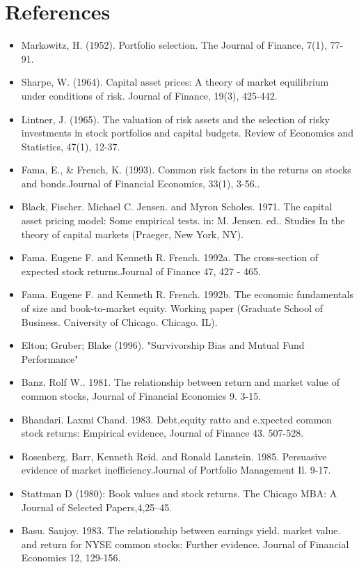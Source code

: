 \documentclass[12pt]{article}
\begin{document}
	\section{References} %
	\begin{itemize}
		\item Markowitz, H. (1952). Portfolio selection. The Journal of Finance, 7(1), 77-91.
		\item Sharpe, W. (1964). Capital asset prices: A theory of market equilibrium under conditions of risk. Journal of Finance, 19(3), 425-442.
		\item Lintner, J. (1965). The valuation of risk assets and the selection of risky investments in stock portfolios and capital budgets. Review of Economics and Statistics, 47(1), 12-37.
		\item Fama, E., \& French, K. (1993). Common risk factors in the returns on stocks and bonds.Journal of Financial Economics, 33(1), 3-56..
		\item Black, Fischer. Michael C. Jensen. and Myron Scholes. 1971. The capital asset pricing model: Some empirical tests. in: M. Jensen. ed.. Studies In the theory of capital markets (Praeger, New York, NY).
		\item Fama. Eugene F. and Kenneth R. French. 1992a. The cross-section of expected stock returns.Journal of Finance 47, 427 - 465.
		\item Fama. Eugene F. and Kenneth R. French. 1992b. The economic fundamentals of size and book-to-market equity. Working paper (Graduate School of Business. Cniversity of Chicago. Chicago. IL).
		\item Elton; Gruber; Blake (1996). "Survivorship Bias and Mutual Fund Performance"
		\item Banz. Rolf W.. 1981. The relationship between return and market value of common stocks, Journal	of Financial Economics 9. 3-15.
		\item Bhandari. Laxmi Chand. 1983. Debt,equity ratto and e.xpected common stock returns: Empirical evidence, Journal of Finance 43. 507-528.
		\item Rosenberg. Barr, Kenneth Reid. and Ronald Lanstein. 1985. Persuasive evidence of market inefficiency.Journal of Portfolio Management Il. 9-17.
		\item Stattman D (1980): Book values and stock returns. The Chicago MBA: A Journal of Selected Papers,4,25–45. 
		\item Basu. Sanjoy. 1983. The relationship between earnings yield. market value. and return for NYSE common stocks: Further evidence. Journal of Financial Economics 12, 129-156.

\end{itemize}
\end{document}

